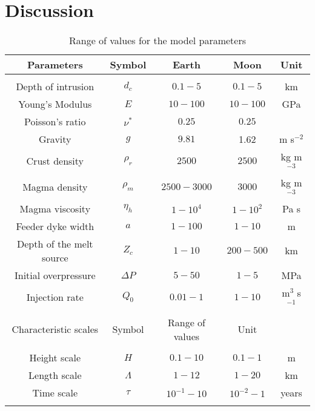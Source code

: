 \section{Discussion}
\label{C2-sec:discussion}

\begin{table}
  \caption{Range of values for the model parameters}
  \centering
  \begin{tabular}{c|c|c|c|c}
    Parameters& Symbol & Earth & Moon&Unit\\
    \hline
    &&&&\\
    Depth of intrusion & $d_c$ & $0.1-5$ &$0.1-5$ &km \\
    Young's Modulus & $E$ & $10-100$ &$10-100$ &GPa \\
    Poisson's ratio & $\nu^*$ & $0.25$ &$0.25$ &\\
    Gravity & $g$ & $9.81$ &1.62&m s$^{-2}$ \\
    Crust density & $\rho_{r}$ & $2500$ &$2500$&kg m$^{-3}$ \\
    Magma density & $\rho_{m}$ & $2500-3000$ &$3000$&kg m$^{-3}$ \\
    Magma viscosity & $\eta_h $ & $1-10^{4}$ &$1-10^{2}$&Pa s \\
    Feeder dyke width & $a$ & $1-100$ &$1-10$&m \\
    Depth of the melt source & $Z_{c}$ & $ 1-10$&$200-500$& km \\ 
    Initial overpressure & $\Delta P$ & $5-50$ &$1-5$ &MPa \\
    Injection rate & $Q_{0}$ &$0.01-1$ &$1-10$&m$^{3}$ s$^{-1}$ \\
              &&&&\\
    \hline
    Characteristic scales & Symbol & Range of values & Unit\\
    \hline
              &&&&\\
    Height scale & $H$& $0.1-10$ &$0.1-1$ &m \\
    Length scale & $\Lambda$ & $1-12$&$1-20$& km \\
    Time scale & $\tau$ & $10^{-1}-10$&$10^{-2}-1$& years \\
    \label{tab2}
  \end{tabular} 
\end{table}


